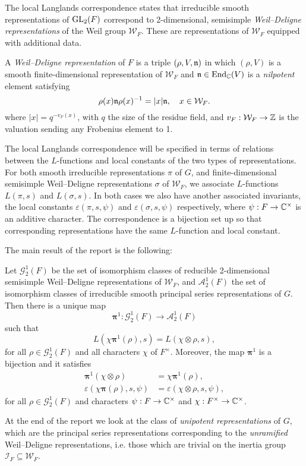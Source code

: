 The local Langlands correspondence states that irreducible smooth representations of $\mathrm{GL}_2(F)$ correspond to 2-dimensional, semisimple \emph{Weil--Deligne representations} of the Weil group $\mathcal{W}_F$. These are representations of $\mathcal{W}_F$ equipped with additional data.
\begin{defn}
	A \emph{Weil--Deligne representation} of $F$ is a triple $(\rho,V,\mathfrak{n})$ in which $(\rho,V)$ is a smooth finite-dimensional representation of $\mathcal{W}_F$ and $\mathfrak{n}\in\mathrm{End}_{\mathbb{C}}(V)$ is a \textit{nilpotent} element satisfying
	$$\rho(x)\mathfrak{n}\rho(x)^{-1}=|x|\mathfrak{n},\quad x\in \mathcal{W}_F.$$
	where $|x| = q^{-v_F(x)}$, with $q$ the size of the residue field, and $v_F:\mathcal{W}_F\to \mathbb{Z}$ is the valuation sending any Frobenius element to 1.
\end{defn}


The local Langlands correspondence will be specified in terms of relations between the $L$-functions and local constants of the two types of representations. For both smooth irreducible representations $\pi$ of $G$, and finite-dimensional semisimple Weil--Deligne representations $\sigma$ of $\mathcal{W}_F$, we associate $L$-functions $L(\pi, s)$ and $L(\sigma, s)$. In both cases we also have another associated invariants, the local constants $\varepsilon(\pi, s, \psi)$ and $\varepsilon(\sigma, s, \psi)$ respectively, where $\psi: F\to \mathbb{C}^\times$ is an additive character. The correspondence is a bijection set up so that corresponding representations have the same $L$-function and local constant.

The main result of the report is the following:
\begin{thm}[ = Theorem \ref{thm:langcorr2}, Langlands correspondence for principal series representations]
    Let $\mathcal{G}_2^1(F)$ be the set of isomorphism classes of reducible 2-dimensional semisimple Weil--Deligne representations of $\mathcal{W}_F$, and $\mathcal{A}_2^1(F)$ the set of isomorphism classes of irreducible smooth principal series representations of $G$. Then there is a unique map
$$\bm\pi^1:\mathcal{G}_2^1(F)\longrightarrow\mathcal{A}_2^1(F)$$
such that 
\begin{equation*}
	L(\chi\bm\pi^1(\rho),s)=L(\chi\otimes\rho,s),
\end{equation*}
for all $\rho\in\mathcal{G}_2^1(F)$ and all characters $\chi$ of $F^\times$. Moreover, the map $\bm\pi^1$ is a bijection and it satisfies
\begin{equation*}
	\begin{split}
		\bm\pi^1(\chi\otimes\rho)&=\chi\bm\pi^1(\rho),\\
		\varepsilon(\chi\bm\pi(\rho),s,\psi)&=\varepsilon(\chi\otimes\rho,s,\psi),
	\end{split}
\end{equation*}
for all $\rho\in\mathcal{G}_2^1(F)$ and characters $\psi:F \to \mathbb{C}^\times$ and $\chi: F^\times \to \mathbb{C}^\times$.
\end{thm}
At the end of the report we look at the class of \emph{unipotent representations} of $G$, which are the principal series representations corresponding to the \emph{unramified} Weil--Deligne representations, i.e. those which are trivial on the inertia group $\mathcal{I}_F\subseteq \mathcal{W}_F$.

